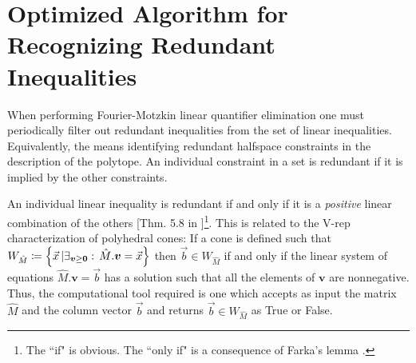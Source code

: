 {\section{Optimized Algorithm for Recognizing Redundant Inequalities}\label{sec:redundancy}
When performing Fourier-Motzkin linear quantifier elimination one must periodically filter out redundant inequalities from the set of linear inequalities. Equivalently, the means identifying redundant halfspace constraints in the description of the polytope. An individual constraint in a set is redundant if it is implied by the other constraints. 

An individual linear inequality is redundant if and only if it is a \emph{positive} linear combination of the others [Thm. 5.8 in \citealp{fordan1999projection}]\footnote{The ``if" is obvious. The ``only if" is a consequence of Farka's lemma \cite{fordan1999projection}.}. This is related to the V-rep characterization of polyhedral cones: If a cone is defined such that $W_{\hat{M}}\coloneqq\left\lbrace\vec{x}\,|\exists_{\bm{v}\geq\bm{0}}:\, \hat{M}.\bm{v}=\vec{x}\right\rbrace$ then $\vec{b}\in W_{\hat{M}}$ if and only if the linear system of equations $\hat{M}.\bm{v}=\vec{b}$ has a solution such that all the elements of $\bm{v}$ are nonnegative.  Thus, the computational tool required is one which accepts as input the matrix $\hat{M}$ and the column vector $\vec{b}$ and returns $\vec{b}\in W_{\hat{M}}$ as True or False. 




}
